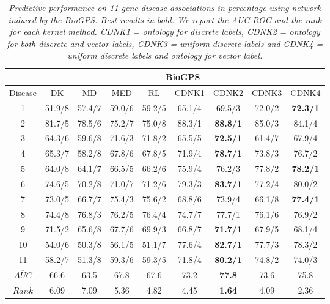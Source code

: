 \documentclass[review]{elsarticle}
\begin{document}
\begin{table}
\caption{\textit {Predictive performance on 11 gene-disease associations in percentage using network induced by the BioGPS. Best results in bold. We report the AUC ROC and the rank for each kernel method.  CDNK1 = ontology for discrete labels, CDNK2 = ontology for both discrete and vector labels, CDNK3 = uniform discrete labels and CDNK4 = uniform discrete labels and ontology for vector label.}} \vspace{1em}
\centering
\setlength{\tabcolsep}{1mm}
\begin{tabular}{|c|c|c|c|c|c|c|c|c|}
\hline
         & \multicolumn{8}{c|}{\textbf{BioGPS}}\\
 \hline
Disease & DK & MD & MED & RL & CDNK1 & CDNK2 & CDNK3 & CDNK4\\

 \hline
1 & 51.9/8 & 57.4/7 & 59.0/6 & 59.2/5 & 65.1/4 & 69.5/3 & 72.0/2 & \textbf{72.3/1} \\

2 & 81.7/5 & 78.5/6 & 75.2/7 & 75.0/8 & 88.3/1 & \textbf{88.8/1} & 85.0/3 & 84.1/4 \\

3 & 64.3/6 & 59.6/8 & 71.6/3 & 71.8/2 & 65.5/5 & \textbf{72.5/1} & 61.4/7 & 67.9/4 \\

4 & 65.3/7 & 58.2/8 & 67.8/6 & 67.8/5 & 71.9/4 & \textbf{78.7/1} & 73.8/3 & 76.7/2 \\

5 & 64.0/8 & 64.1/7 & 66.5/5 & 66.2/6 & 75.9/4 & 76.2/3 & 77.8/2 & \textbf{78.2/1} \\

6 & 74.6/5 & 70.2/8 & 71.0/7 & 71.2/6 & 79.3/3 & \textbf{83.7/1} & 77.2/4 & 80.0/2 \\

7 & 73.0/5 & 66.7/7 & 75.4/3 & 75.6/2 & 68.8/6 & 73.9/4 & 66.1/8 & \textbf{77.4/1} \\

8 & 74.4/8 & 76.8/3 & 76.2/5 & 76.4/4 & 74.7/7 & 77.7/1 & 76.1/6 & 76.9/2 \\

9 & 71.5/2 & 65.6/8 & 67.7/6 & 69.9/3 & 66.8/7 & \textbf{71.7/1} & 67.9/5 & 68.1/4 \\

10 & 54.0/6 & 50.3/8 & 56.1/5 & 51.1/7 & 77.6/4 & \textbf{82.7/1} & 77.7/3 & 78.3/2 \\

11 & 58.2/7 & 51.3/8 & 59.3/6 & 59.3/5 & 71.8/4 & \textbf{80.2/1} & 74.8/2 & 74.0/3 \\

\hline
$\overline{AUC}$ & 66.6	& 63.5 & 67.8 &	67.6 & 73.2 & \textbf{77.8} & 73.6 & 75.8 \\


$\overline{Rank}$ & 6.09 & 7.09 &  5.36 & 4.82 & 4.45 & \textbf{1.64} & 4.09 & 2.36 \\
 \hline 
\end{tabular}
\label{fig:cdnk-biogps}
\end{table}
\end{document}
